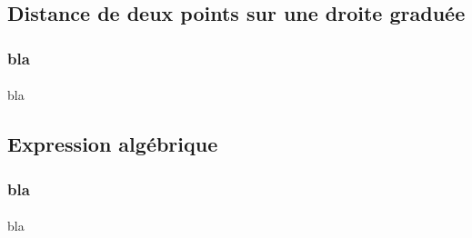 \documentclass{beamer}
\begin{document}
\subsection{Distance de deux points sur une droite graduée}

\begin{frame}
	\frametitle{bla}  
	\framesubtitle{}	
	
	bla
\end{frame}

\subsection{Expression algébrique}

\begin{frame}
	\frametitle{bla}  
	\framesubtitle{}	
	
	bla
\end{frame}
\end{document}
